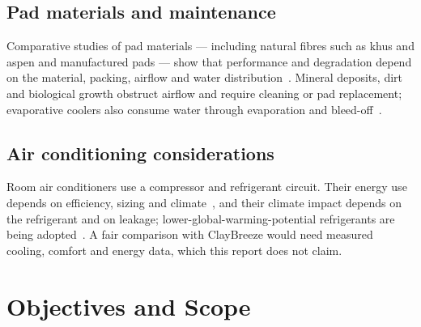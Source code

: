 \documentclass[11pt,a4paper]{report}
\begin{document}
\section{Pad materials and maintenance}
Comparative studies of pad materials --- including natural fibres such as khus and aspen and manufactured pads --- show that performance and degradation depend on the material, packing, airflow and water distribution~\cite{jain,alsulaiman}. Mineral deposits, dirt and biological growth obstruct airflow and require cleaning or pad replacement; evaporative coolers also consume water through evaporation and bleed-off~\cite{watson,doe}.

\section{Air conditioning considerations}
Room air conditioners use a compressor and refrigerant circuit. Their energy use depends on efficiency, sizing and climate~\cite{energystar}, and their climate impact depends on the refrigerant and on leakage; lower-global-warming-potential refrigerants are being adopted~\cite{epa,icap}. A fair comparison with ClayBreeze would need measured cooling, comfort and energy data, which this report does not claim.

\chapter{Objectives and Scope}
\end{document}
